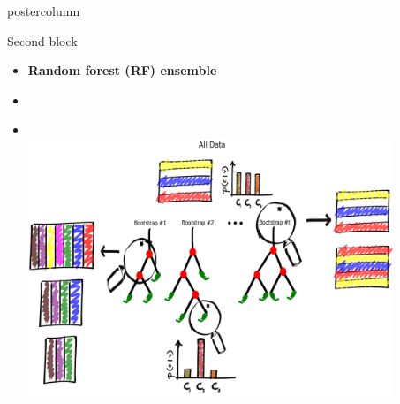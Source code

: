 \documentclass[final]{beamer}
\begin{document}
\begin{frame}
\begin{columns}
\begin{column}{.49\textwidth}
\begin{beamercolorbox}[center,wd=\textwidth]{postercolumn}
\begin{minipage}[T]{.95\textwidth}
{            \begin{block}{Second block}
            \begin{itemize}
            	\item \textbf{\color{orounam}Random forest (RF) ensemble}
            	\item []
            	\item []
            	\begin{columns}
            		\begin{column}{.54\textwidth}
            		\\
            			\includegraphics[width = 0.9\textwidth, height = 0.15\textheight]{images/framework/RF_train.png}
            		\end{column}
            		\begin{column}{.44\textwidth}
            		\\

\end{column}
\end{columns}
\end{itemize}
\end{block}}
\end{minipage}
\end{beamercolorbox}
\end{column}
\end{columns}
\end{frame}
\end{document}

